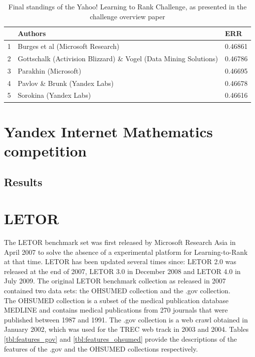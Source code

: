 \begin{table}
\begin{tabular}{l|p{6.3cm}|l}
 & Authors & ERR \\
 \hline 
1 & Burges et al (Microsoft Research) & 0.46861 \\ 
2 & Gottschalk (Activision Blizzard) \& Vogel (Data Mining Solutions) & 0.46786 \\ 
3 & Parakhin (Microsoft) & 0.46695 \\ 
4 & Pavlov \& Brunk (Yandex Labs) & 0.46678 \\ 
5 & Sorokina (Yandex Labs) & 0.46616 \\ 
\end{tabular}
\caption{Final standings of the Yahoo! Learning to Rank Challenge, as presented in the challenge overview paper\cite{Chapelle2011a}}
\label{fig:yahoo_results}
\end{table}



\chapter{Yandex Internet Mathematics competition}

\section{Results}



\chapter{LETOR}
The LETOR benchmark set was first released by Microsoft Research Asia in April 2007 to solve the absence of a experimental platform for Learning-to-Rank at that time. LETOR has been updated several times since: LETOR 2.0 was released at the end of 2007, LETOR 3.0 in December 2008 and LETOR 4.0 in July 2009. The original LETOR benchmark collection\cite{Liu2007b} as released in 2007 contained two data sets: the OHSUMED collection and the .gov collection.\\

The OHSUMED collection is a subset of the medical publication database MEDLINE and contains medical publications from 270 journals that were published between 1987 and 1991. The .gov collection is a web crawl obtained in January 2002, which was used for the TREC web track in 2003 and 2004. Tables \ref{tbl:features_gov} and \ref{tbl:features_ohsumed} provide the descriptions of the features of the .gov and the OHSUMED collections respectively.\\

